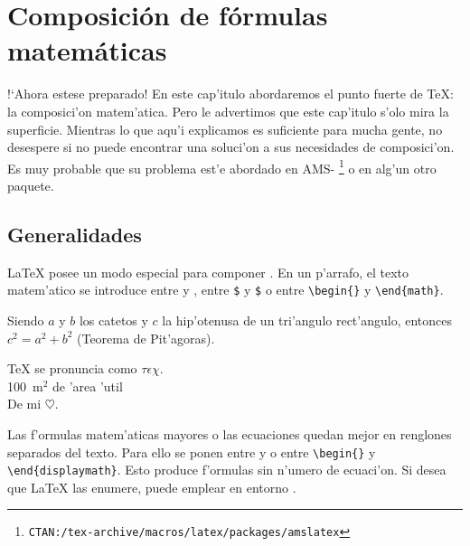 \chapter{Composici\'on de f\'ormulas matem\'aticas}

\begin{intro}
  !`Ahora estese preparado! En este cap'itulo abordaremos el punto
  fuerte de \TeX: la composici'on matem'atica. Pero le advertimos que
  este cap'itulo s'olo mira la superficie. Mientras lo que aqu'i
  explicamos es suficiente para mucha gente, no desespere si no puede
  encontrar una soluci'on a sus necesidades de composici'on. Es muy
  probable que su problema est'e abordado en AMS-\LaTeXe
  \footnote{\texttt{CTAN:/tex-archive/macros/latex/packages/amslatex}}
  o en alg'un otro paquete.
\end{intro}
  
\section{Generalidades}

\LaTeX{} posee un modo especial para componer . En un
p'arrafo, el texto matem'atico se introduce entre \ci{(} y \ci{)},
 entre \texttt{\$} y \texttt{\$} o entre
\verb|\begin{|\verb|}| y \verb|\end{math}|.

\begin{example}
Siendo $a$ y $b$ los catetos
y $c$ la hip'otenusa
de un tri'angulo rect'angulo,
entonces $c^{2}=a^{2}+b^{2}$
(Teorema de Pit'agoras).
\end{example}

\begin{example}
\TeX{} se pronuncia como
 $\tau\epsilon\chi$.\\[6pt]
100~m$^{2}$ de 'area 'util \\[6pt]
De mi $\heartsuit$.
\end{example}

Las f'ormulas matem'aticas mayores o las ecuaciones quedan mejor en
renglones separados del texto. Para ello se ponen entre \ci{[} y
\ci{]} o entre \verb|\begin{|\verb|}| y
  \verb|\end{displaymath}|. Esto produce f'ormulas sin n'umero de
ecuaci'on. Si desea que \LaTeX{} las enumere, puede emplear en entorno
.

